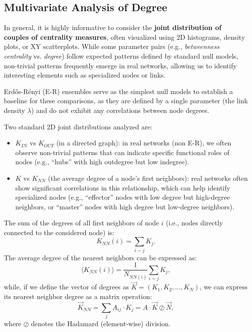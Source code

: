 \subsection{Multivariate Analysis of Degree}

In general, it is highly informative to consider the \textbf{joint distribution of couples of centrality measures}, often visualized using 2D histograms, density plots, or XY scatterplots. While some parameter pairs (e.g., \textit{betweenness centrality} vs. \textit{degree}) follow expected patterns defined by standard null models, non-trivial patterns frequently emerge in real networks, allowing us to identify interesting elements such as specialized nodes or links.

Erdős-Rényi (E-R) ensembles serve as the simplest null models to establish a baseline for these comparisons, as they are defined by a single parameter (the link density $\lambda$) and do not exhibit any correlations between node degrees.

Two standard 2D joint distributions analyzed are:
\begin{itemize}
    \item $K_{IN}$ vs $K_{OUT}$ (in a directed graph): in real networks (non E-R), we often observe non-trivial patterns that can indicate specific functional roles of nodes (e.g., ``hubs'' with high outdegree but low indegree).
    \item $K$ vs $K_{NN}$ (the average degree of a node's first neighbors): real networks often show significant correlations in this relationship, which can help identify specialized nodes (e.g., ``effector'' nodes with low degree but high-degree neighbors, or ``master'' nodes with high degree but low-degree neighbors).
\end{itemize}

\begin{definition}
    The sum of the degrees of all first neighbors of node $i$ (i.e., nodes directly connected to the considered node) is:
    \[
        K_{NN}(i) = \sum_{i \sim j} K_j.
    \]
    The average degree of the nearest neighbors can be expressed as:
    \[
        \langle K_{NN}(i) \rangle = \frac{1}{N_{NN(i)}} \sum_{i \sim j} K_j,
    \]
    while, if we define the vector of degrees as $\vec{K} = (K_1, K_2, \ldots, K_N)$, we can express its nearest neighbor degree as a matrix operation:
    \[
        \vec{K}_{NN} = \sum_{j} A_{ij} \cdot K_j = A \cdot \vec{K} \oslash \vec{N},
    \]
    where $\oslash$ denotes the Hadamard (element-wise) division.
\end{definition}

